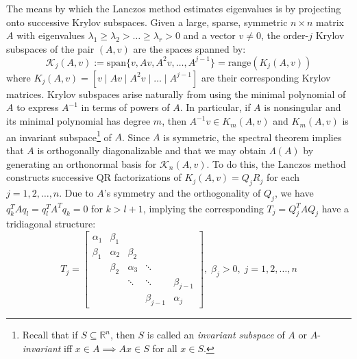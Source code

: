 \documentclass[12pt]{article}
\numberwithin{equation}{section}
\newcommand{\+}{%
	\raisebox{0.18ex}{\scaleobj{0.55}{+}}
}
\theoremstyle{definition}
\begin{document}
The means by which the Lanczos method estimates eigenvalues is by projecting onto successive Krylov subspaces. Given a large, sparse, symmetric $n \times n$ matrix $A$ with eigenvalues $\lambda_1 \geq \lambda_2 > \dots \geq \lambda_r > 0$ and a vector $v \neq 0$, the order-$j$ Krylov subspaces of the pair $(A, v)$ are the spaces spanned by: 
\begin{equation}
	\mathcal{K}_j(A, v) := \mathrm{span}\{ v, Av, A^2 v, \dots, A^{j-1} \} = \mathrm{range}(K_j(A, v))
\end{equation}
where $K_j(A, v) = [ v \mid Av \mid A^2 v \mid \dots \mid A^{j-1}]$ are their corresponding Krylov matrices. 
Krylov subspaces arise naturally from using the minimal polynomial of $A$ to express $A^{-1}$ in terms of powers of $A$. In particular, if $A$ is nonsingular and its minimal polynomial has degree $m$, then $A^{-1}v \in K_m(A, v)$ and $K_m(A, v)$ is an invariant subspace\footnote{Recall that if $S \subseteq \mathbb{R}^n$, then $S$ is called an \emph{invariant subspace} of $A$ or $A$-\emph{invariant} iff $x \in A \implies Ax \in S$ for all $x \in S$.} of $A$.
Since $A$ is symmetric, the spectral theorem implies that $A$ is orthogonally diagonalizable and that we may obtain $\Lambda(A)$ by generating an orthonormal basis for $\mathcal{K}_n(A, v)$. 
To do this, the Lanczos method constructs successive QR factorizations of $K_j(A,v) = Q_j R_j$ for each $j = 1, 2, \dots, n$.
Due to $A$'s symmetry and the orthogonality of $Q_j$, we have $q_k^T A q_l = q_l^T A^T q_k = 0$ for $k > l + 1$, implying the corresponding $T_j = Q_j^T A Q_j$ have a tridiagonal structure:
\begin{equation}
	T_j = \begin{bmatrix} 
	\alpha_1 & \beta_1 & & & \\
	\beta_1 & \alpha_2 & \beta_2 & & \\
	 & \beta_2 & \alpha_3 & \ddots & \\
	& & \ddots & \ddots & \beta_{j-1} \\
	& & & \beta_{j-1} & \alpha_{j} 
	\end{bmatrix}, \; \beta_j > 0, \; j = 1, 2, \dots, n
\end{equation}
\end{document}

